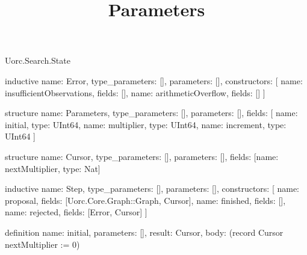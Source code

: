 \begin{lexlean}{Uorc.Search.State}
\title{Parameters}
\begin{semanticmodule}
inductive{
  name: Error,
  type_parameters: [],
  parameters: [],
  constructors: [
    {name: insufficientObservations, fields: []},
    {name: arithmeticOverflow, fields: []}
  ]
}

structure{
  name: Parameters,
  type_parameters: [],
  parameters: [],
  fields: [
    {name: initial, type: UInt64},
    {name: multiplier, type: UInt64},
    {name: increment, type: UInt64}
  ]
}

structure{
  name: Cursor,
  type_parameters: [],
  parameters: [],
  fields: [{name: nextMultiplier, type: Nat}]
}

inductive{
  name: Step,
  type_parameters: [],
  parameters: [],
  constructors: [
    {name: proposal, fields: [Uorc.Core.Graph::Graph, Cursor]},
    {name: finished, fields: []},
    {name: rejected, fields: [Error, Cursor]}
  ]
}

definition{
  name: initial,
  parameters: [],
  result: Cursor,
  body: (record Cursor {nextMultiplier := 0})
}


\end{semanticmodule}
\end{lexlean}
